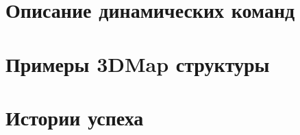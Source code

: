 \documentclass[13pt]{extbook}
\begin{document}
   	\setcounter{secnumdepth}{0}

    \appendix
    
    \chapter{Описание динамических команд}\label{apx:dlib_doc}
    

    \chapter{Примеры 3DMap структуры}\label{apx:3dmap}
    

    \clearpage
    \printglossaries 
    
     \chapter{Истории успеха}
    
\end{document}
